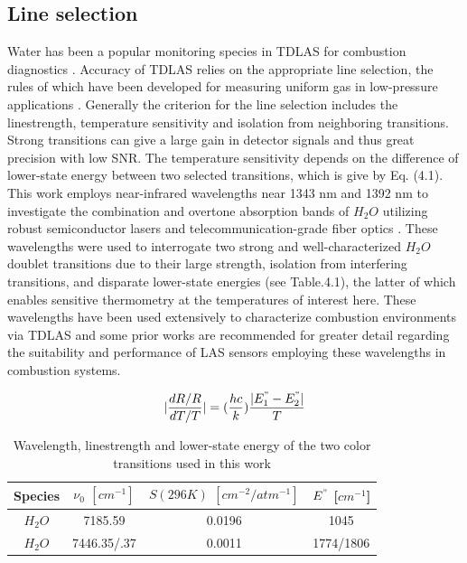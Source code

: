 \subsection{Line selection}
Water has been a popular monitoring species in TDLAS for combustion diagnostics \cite{Goldenstein2017}. Accuracy of TDLAS relies on the appropriate line selection, the rules of which have been developed for measuring uniform gas in low-pressure applications \cite{Zhou2005}. Generally the criterion for the line selection includes the linestrength, temperature sensitivity and isolation from neighboring transitions. Strong transitions can give a large gain in detector signals and thus great precision with low SNR. The temperature sensitivity depends on the difference of lower-state energy between two selected transitions, which is give by Eq. (4.1). This work employs near-infrared wavelengths near 1343 nm and 1392 nm to investigate the combination and overtone absorption bands of $H_2O$ utilizing robust semiconductor lasers and telecommunication-grade fiber optics \cite{FURLONG1998103}. These wavelengths were used to interrogate two strong and well-characterized $H_2O$ doublet transitions due to their large strength, isolation from interfering transitions, and disparate lower-state energies (see Table.4.1), the latter of which enables sensitive thermometry at the temperatures of interest here. These wavelengths have been used extensively to characterize combustion environments via TDLAS and some prior works \cite{Goldenstein:16,Goldenstein2014,rieker2009calibration,strand2015quantification} are recommended for greater detail regarding the suitability and performance of LAS sensors employing these wavelengths in combustion systems.


\begin{equation}
|\frac{dR/R}{dT/T}|=(\frac{hc}{k})\frac{|E_1^"-E_2^"|}{T}
\end{equation}

\begin{table}[h]
\begin{center}
\begin{tabular}{ c c c c }
\hline
Species & $\nu_0$ $[cm^{-1}]$ & $S(296 K)$ $[cm^{-2}/atm^{-1}]$ & $E^"$ [$cm^{-1}$]\\ \hline
$H_2O$ & 7185.59 & 0.0196 & 1045\\ 
$H_2O$ & 7446.35/.37 & 0.0011 & 1774/1806\\ \hline
\end{tabular}
\caption{Wavelength, linestrength and lower-state energy of the two color transitions used in this work \cite{Goldenstein:16}}
\label{table:ch4_1}
\end{center}
\end{table}


